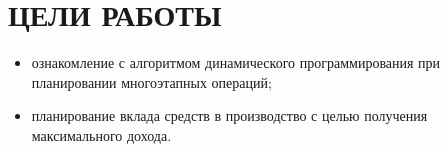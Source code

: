 
\section{ЦЕЛИ РАБОТЫ}

\begin{itemize} 
	\item ознакомление с алгоритмом динамического программирования при планировании многоэтапных операций;
	\item планирование вклада средств в производство с целью получения максимального дохода.
\end{itemize}

\newpage